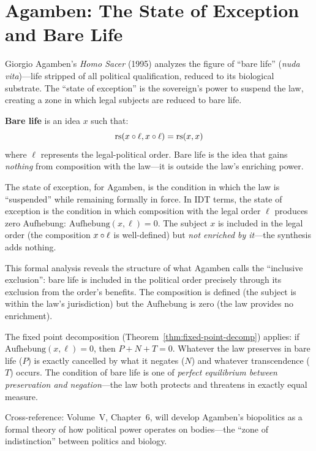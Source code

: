 \section{Agamben: The State of Exception and Bare Life}

Giorgio Agamben's \textit{Homo Sacer} (1995) analyzes the figure of
``bare life'' (\textit{nuda vita})---life stripped of all political
qualification, reduced to its biological substrate. The ``state of exception''
is the sovereign's power to suspend the law, creating a zone in which legal
subjects are reduced to bare life.

\begin{definition}
\label{def:bare-life}
\textbf{Bare life} is an idea $x$ such that:
\[
\mathrm{rs}(x \circ \ell, x \circ \ell) = \mathrm{rs}(x, x)
\]
where $\ell$ represents the legal-political order. Bare life is the idea
that gains \emph{nothing} from composition with the law---it is outside
the law's enriching power.
\end{definition}

\begin{interpretation}
The state of exception, for Agamben, is the condition in which the law is
``suspended'' while remaining formally in force. In IDT terms, the state of
exception is the condition in which composition with the legal order $\ell$
produces zero Aufhebung: $\mathrm{Aufhebung}(x, \ell) = 0$. The subject $x$
is included in the legal order (the composition $x \circ \ell$ is
well-defined) but \emph{not enriched by it}---the synthesis adds nothing.

This formal analysis reveals the structure of what Agamben calls the
``inclusive exclusion'': bare life is included in the political order
precisely through its exclusion from the order's benefits. The composition
is defined (the subject is within the law's jurisdiction) but the Aufhebung
is zero (the law provides no enrichment).

The fixed point decomposition (Theorem~\ref{thm:fixed-point-decomp}) applies:
if $\mathrm{Aufhebung}(x, \ell) = 0$, then $P + N + T = 0$. Whatever the law
preserves in bare life ($P$) is exactly cancelled by what it negates ($N$)
and whatever transcendence ($T$) occurs. The condition of bare life is one of
\emph{perfect equilibrium between preservation and negation}---the law both
protects and threatens in exactly equal measure.

Cross-reference: Volume~V, Chapter~6, will develop Agamben's biopolitics as
a formal theory of how political power operates on bodies---the ``zone of
indistinction'' between politics and biology.
\end{interpretation}

